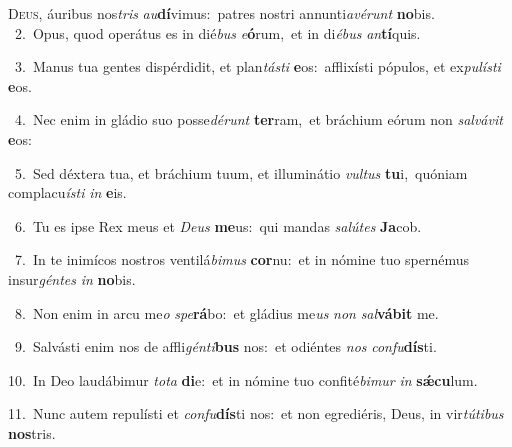 \lettrine{\initial\textcolor{\initialcolor}{D}}{eus,} áuribus nos\textit{tris} \textit{au}\-\textbf{dí}vimus:~\star patres nostri annunti\-\textit{a}\-\textit{vé}\textit{runt} \textbf{no}\-bis.\\
{\numbfont\textcolor{\numbcolor}{~2.}}~Opus, quod operátus es in dié\textit{bus} \textit{e}\-\textbf{ó}rum,~\star et in di\-\textit{é}\-\textit{bus} \textit{an}\-\textbf{tí}quis.\par
{\numbfont\textcolor{\numbcolor}{~3.}}~Manus tua gentes dispérdidit, et plan\-\textit{tás}\-\textit{ti} \textbf{e}\-os:~\star afflixísti pópulos, et ex\-\textit{pu}\-\textit{lís}\textit{ti} \textbf{e}\-os.\par
{\numbfont\textcolor{\numbcolor}{~4.}}~Nec enim in gládio suo posse\-\textit{dé}\-\textit{runt} \textbf{ter}\-ram,~\star et bráchium eórum non \textit{sal}\-\textit{vá}\textit{vit} \textbf{e}\-os:\par
{\numbfont\textcolor{\numbcolor}{~5.}}~Sed déxtera tua, et bráchium tuum, et illuminátio \textit{vul}\-\textit{tus} \textbf{tu}\-i,~\star quóniam complacu\-\textit{ís}\-\textit{ti} \textit{in} \textbf{e}\-is.\par
{\numbfont\textcolor{\numbcolor}{~6.}}~Tu es ipse Rex meus et \textit{De}\-\textit{us} \textbf{me}\-us:~\star qui mandas \textit{sa}\-\textit{lú}\textit{tes} \textbf{Ja}\-cob.\par
{\numbfont\textcolor{\numbcolor}{~7.}}~In te inimícos nostros ventilá\-\textit{bi}\-\textit{mus} \textbf{cor}\-nu:~\star et in nómine tuo spernémus insur\-\textit{gén}\-\textit{tes} \textit{in} \textbf{no}\-bis.\par
{\numbfont\textcolor{\numbcolor}{~8.}}~Non enim in arcu me\textit{o} \textit{spe}\-\textbf{rá}bo:~\star et gládius me\textit{us} \textit{non} \textit{sal}\-\textbf{vá}\textbf{bit} me.\par
{\numbfont\textcolor{\numbcolor}{~9.}}~Salvásti enim nos de affli\-\textit{gén}\-\textit{ti}\textbf{bus} nos:~\star et odiéntes \textit{nos} \textit{con}\-\textit{fu}\textbf{dís}ti.\par
{\numbfont\textcolor{\numbcolor}{10.}}~In Deo laudábimur \textit{to}\-\textit{ta} \textbf{di}\-e:~\star et in nómine tuo confité\-\textit{bi}\-\textit{mur} \textit{in} \textbf{sǽ}\-\textbf{cu}lum.\par
{\numbfont\textcolor{\numbcolor}{11.}}~Nunc autem repulísti et \textit{con}\-\textit{fu}\textbf{dís}ti nos:~\star et non egrediéris, Deus, in vir\-\textit{tú}\-\textit{ti}\textit{bus} \textbf{nos}\-tris.\par
